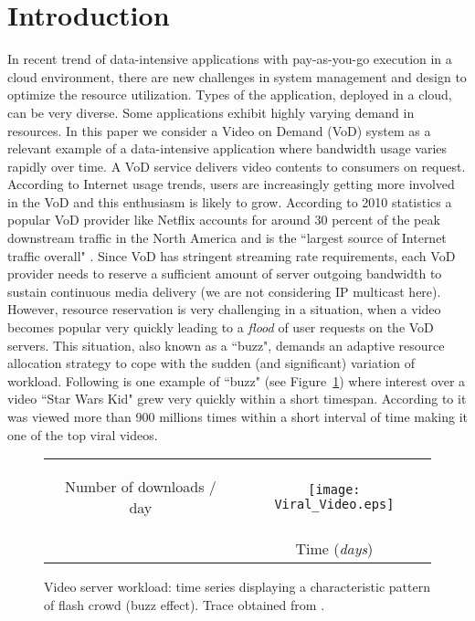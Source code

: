 \documentclass[twoside]{article}
\newcommand{\roy}[2]{#2}
\begin{document}
\makeRR   \tableofcontents
\section{Introduction}
\label{sec:intro}

In recent trend of data-intensive applications with pay-as-you-go execution in a cloud environment, there are new challenges in system management and design to optimize the resource utilization. Types of the application, deployed in a cloud, can be very diverse. \roy{There are some applications that need to be rapidly cloned or re-allocated, like a pre-production environment.}{} Some applications exhibit highly varying demand in resources. In this paper we consider a Video on Demand (VoD) system as a relevant example of a data-intensive application where bandwidth usage varies rapidly over time. \newline
A VoD service delivers video contents to consumers on request. According to Internet usage trends, users are increasingly getting more involved in the VoD and this enthusiasm is likely to grow. According to 2010 statistics a popular VoD provider like Netflix accounts for around 30 percent of  the peak downstream traffic in the North America and is the ``largest source of Internet traffic overall" \cite{website:sandvine}. Since VoD has stringent streaming rate requirements, each VoD provider needs to reserve a sufficient amount of server outgoing bandwidth to sustain continuous media delivery (we are not considering IP multicast here). However, resource reservation is very challenging in a situation, when a video becomes popular very quickly leading to a \emph{flood} of user requests on the VoD servers. This situation, also known as a ``buzz", demands an adaptive resource allocation strategy to cope with the sudden (and significant) variation of workload. Following is one example of ``buzz" (see Figure~\ref{fig:viral}) where interest over a video ``Star Wars Kid" \cite{website:waxy} grew very quickly within a short timespan. According to \cite{website:bbc} it was viewed more than 900 millions times within a short interval of time making it one of the top viral videos.
\begin{figure}[h]
\centering
\hspace*{-3mm}
\begin{tabular}{cc}
\begin{turn}{90}{\hspace*{5mm} Number of downloads / day} \end{turn} &
\hspace*{-4.5mm}\texttt{[image: Viral\_Video.eps]}\\[-2mm]
& Time ({\em days})\\
\end{tabular}
\caption{\small Video server workload: time series displaying a characteristic pattern of flash crowd (buzz effect). Trace obtained from \cite{website:waxy}.}
\label{fig:viral}
\end{figure}
\end{document}
